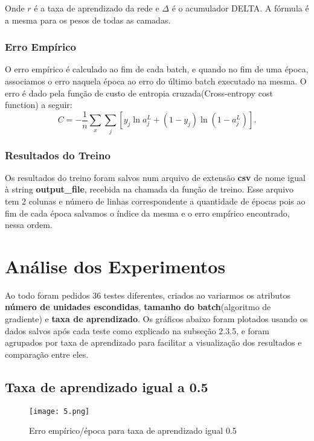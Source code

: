 \documentclass[a4paper, 11pt]{article}
\begin{document}
Onde $r$ é a taxa de aprendizado da rede e $\Delta$ é o acumulador DELTA. A fórmula é a mesma para os pesos de todas as camadas.

\subsubsection{Erro Empírico}
O erro empírico é calculado ao fim de cada batch, e quando no fim de uma época, associamos o erro naquela época ao erro do último batch executado na mesma. O erro é dado pela função de custo de entropia cruzada(Cross-entropy cost function) a seguir:
\begin{equation*}
C = -\frac{1}{n}\sum_{x}\sum_{j}[ y_j \ln a^{L}_{j} + (1 - y_j) \ln (1 - a^{L}_{j})].
\end{equation*}

\subsubsection{Resultados do Treino}

Os resultados do treino foram salvos num arquivo de extensão \textbf{csv} de nome igual à string \textbf{output\_file}, recebida na chamada da função de treino. Esse arquivo tem 2 colunas e número de linhas correspondente a quantidade de épocas pois ao fim de cada época salvamos o índice da mesma e o erro empírico encontrado, nessa ordem. 

\section{Análise dos Experimentos}

Ao todo foram pedidos 36 testes diferentes, criados ao variarmos os atributos \textbf{número de unidades escondidas}, \textbf{tamanho do batch}(algoritmo de gradiente) e \textbf{taxa de aprendizado}. Os gráficos abaixo foram plotados usando os dados salvos após cada teste como explicado na subseção 2.3.5, e foram agrupados por taxa de aprendizado para facilitar a visualização dos resultados e comparação entre eles.

\subsection{Taxa de aprendizado igual a 0.5}

\begin{figure}[h]	
\centering
\texttt{[image: 5.png]}
\caption{Erro empírico/época para taxa de aprendizado igual 0.5}
\end{figure}
\end{document}
